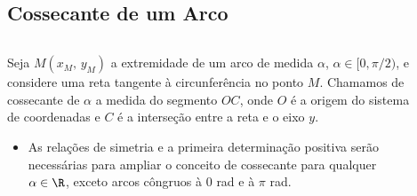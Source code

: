 \subsection{Cossecante de um Arco}
\begin{frame}
  \begin{columns}[onlytextwidth]
    \begin{column}{0.49\textwidth}\vspace{-0.5cm}
      \begin{definition}[Cossecante no 1ºQ]
        Seja $M(x_{M},\,y_{M})$ a extremidade de um arco de medida $\alpha$, $\alpha\in[0,\pi/2)$, e considere uma reta tangente à circunferência no ponto $M$. Chamamos de cossecante de $\alpha$ a medida do segmento $OC$, onde $O$ é a origem do sistema de coordenadas e $C$ é a interseção entre a reta e o eixo $y$.
      \end{definition}
      \begin{highlight}
        \begin{itemize}
          \item As relações de simetria e a primeira determinação positiva serão necessárias para ampliar o conceito de cossecante para qualquer $\alpha\in\R$, exceto arcos côngruos à $0$ rad e à $\pi$ rad.
        \end{itemize}
      \end{highlight}
    \end{column}
    \begin{column}{0.49\textwidth}\vspace{-0.5cm}
      \begin{figure}
      \end{figure}
    \end{column}
  \end{columns}
\end{frame}

